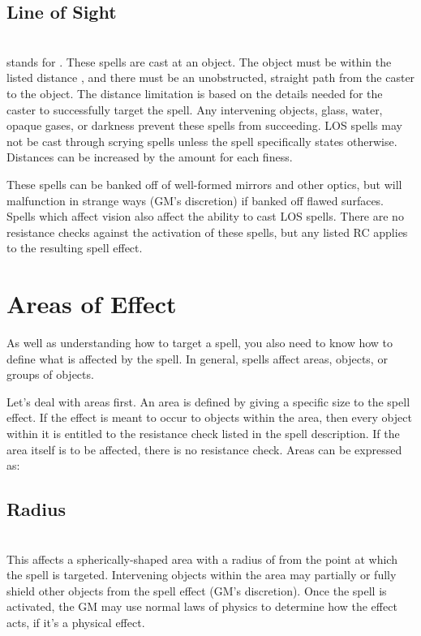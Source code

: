 \begin{multicols*}{2}
\subsection{Line of Sight}
\\
\LOS stands for . These spells are cast at an object. The object must be within the listed distance , and there must be an unobstructed, straight path from the caster to the object. The distance limitation is based on the details needed for the caster to successfully target the spell. Any intervening objects, glass, water, opaque gases, or darkness prevent these spells from succeeding. LOS spells may not be cast through scrying spells unless the spell specifically states otherwise. Distances can be increased by the amount  for each finess.

These spells can be banked off of well-formed mirrors and other optics, but will malfunction in strange ways (GM's discretion) if banked off flawed surfaces. Spells which affect vision also affect the ability to cast LOS spells.  There are no resistance checks against the activation of these spells, but any listed RC applies to the resulting spell effect.
\section{Areas of Effect}
As well as understanding how to target a spell, you also need to know how to define what is affected by the spell. In general, spells affect areas, objects, or groups of objects.

Let's deal with areas first. An area is defined by giving a specific size to the spell effect. If the effect is meant to occur to objects within the area, then every object within it is entitled to the resistance check listed in the spell description. If the area itself is to be affected, there is no resistance check. Areas can be expressed as:
\subsection{Radius}
\\
This affects a spherically-shaped area with a radius of  from the point at which the spell is targeted. Intervening objects within the area may partially or fully shield other objects from the spell effect (GM's discretion). Once the spell is activated, the GM may use normal laws of physics to determine how the effect acts, if it's a physical effect.

\end{multicols*}
